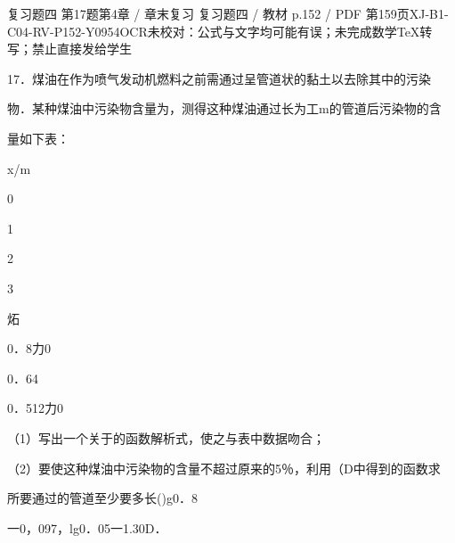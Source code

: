 \begin{bankitem}{复习题四 第17题}{第4章 / 章末复习 复习题四 / 教材 p.152 / PDF 第159页}{XJ-B1-C04-RV-P152-Y0954}{OCR未校对：公式与文字均可能有误；未完成数学TeX转写；禁止直接发给学生}
\begin{ocrdraft}
\par
17．煤油在作为喷气发动机燃料之前需通过呈管道状的黏土以去除其中的污染
\par
物．某种煤油中污染物含量为，测得这种煤油通过长为工m的管道后污染物的含
\par
量如下表：
\par
x/m
\par
0
\par
1
\par
2
\par
3
\par
炻
\par
0．8力0
\par
0．64
\par
0．512力0
\par
（1）写出一个关于的函数解析式，使之与表中数据吻合；
\par
（2）要使这种煤油中污染物的含量不超过原来的5％，利用（D中得到的函数求
\par
所要通过的管道至少要多长()g0．8
\par
一0，097，lg0．05一1.30D．
\end{ocrdraft}
\end{bankitem}
